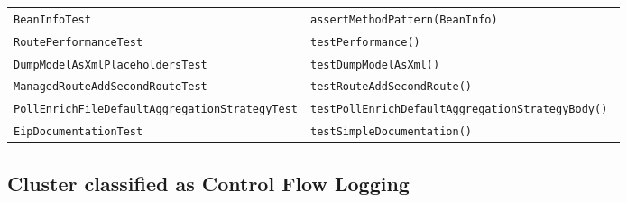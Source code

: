 \begin{center}
\begin{longtable}{ll}
\lstinline/BeanInfoTest/&{\lstinline/assertMethodPattern(BeanInfo)/}\\
\lstinline/RoutePerformanceTest/&{\lstinline/testPerformance()/}\\
\lstinline/DumpModelAsXmlPlaceholdersTest/&{\lstinline/testDumpModelAsXml()/}\\
\lstinline/ManagedRouteAddSecondRouteTest/&{\lstinline/testRouteAddSecondRoute()/}\\
\lstinline/PollEnrichFileDefaultAggregationStrategyTest/&{\lstinline/testPollEnrichDefaultAggregationStrategyBody() /}\\
\lstinline/EipDocumentationTest/&{\lstinline/testSimpleDocumentation()/}\\

\end{longtable}
\end{center}

\subsection{Cluster classified as Control Flow Logging}

